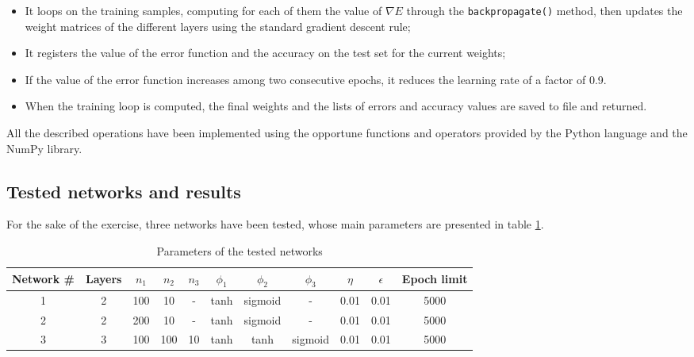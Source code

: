 \documentclass[letterpaper,headings=standardclasses]{scrartcl}
\begin{document}
\begin{itemize}
\begin{itemize}
        \item It loops on the training samples, computing for each of them the value of $\nabla E$ through the \texttt{backpropagate()} method, then updates the weight matrices of the different layers using the standard gradient descent rule;
        
        \item It registers the value of the error function and the accuracy on the test set for the current weights;
        
        \item If the value of the error function increases among two consecutive epochs, it reduces the learning rate of a factor of 0.9.
        
        \item When the training loop is computed, the final weights and the lists of errors and accuracy values are saved to file and returned.

    \end{itemize}

\end{itemize}

All the described operations have been implemented using the opportune functions and operators provided by the Python language and the NumPy library.

\subsection{Tested networks and results}

For the sake of the exercise, three networks have been tested, whose main parameters are presented in table \ref{net_params}.

\begin{table}[h]
    \centering
    \begin{tabular}{|c|c|c|c|c|c|c|c|c|c|c|}
    \hline
    Network \# & Layers & $n_1$ & $n_2$ & $n_3$ & $\phi_1$ & $\phi_2$ & $\phi_3$ & $\eta$ & $\epsilon$ & Epoch limit \\ \hline
    1 & 2 & 100 & 10 & - & tanh & sigmoid & - & 0.01 & 0.01 & 5000 \\ \hline
    2 & 2 & 200 & 10 & - & tanh & sigmoid & - & 0.01 & 0.01 & 5000 \\ \hline
    3 & 3 & 100 & 100 & 10 & tanh & tanh & sigmoid & 0.01 & 0.01 & 5000 \\ \hline
    \end{tabular}
    \caption{Parameters of the tested networks}
    \label{net_params}
\end{table}
\end{document}
